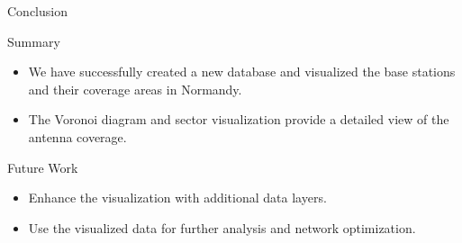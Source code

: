 \begin{frame}{Conclusion}
    \begin{block}{Summary}
        \begin{itemize}
            \item We have successfully created a new database and visualized the base stations and their coverage areas in Normandy.
            \item The Voronoi diagram and sector visualization provide a detailed view of the antenna coverage.
        \end{itemize}
    \end{block}
    \begin{block}{Future Work}
        \begin{itemize}
            \item Enhance the visualization with additional data layers.
            \item Use the visualized data for further analysis and network optimization.
        \end{itemize}
    \end{block}
\end{frame}


